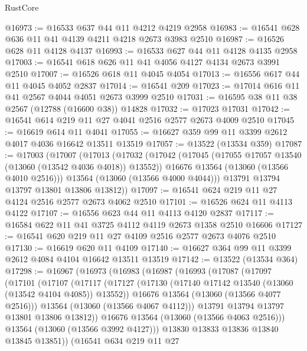 \begin{lexlean}{RustCore}
\begin{coremodule}
@16973 := @16533 @637 @44 @11 @4212 @4219 @2958
@16983 := @16541 @628 @636 @11 @41 @4139 @4211 @4218 @2673 @3983 @2510
@16987 := @16526 @628 @11 @4128 @4137
@16993 := @16533 @627 @44 @11 @4128 @4135 @2958
@17003 := @16541 @618 @626 @11 @41 @4056 @4127 @4134 @2673 @3991 @2510
@17007 := @16526 @618 @11 @4045 @4054
@17013 := @16556 @617 @44 @11 @4045 @4052 @2837
@17014 := @16541 @209
@17023 := @17014 @616 @11 @41 @2567 @4044 @4051 @2673 @3999 @2510
@17031 := @16595 @38 @11 @38 @2567 (@12788 (@16600 @38)) @14828
@17032 := @17023 @17031
@17042 := @16541 @614 @219 @11 @27 @4041 @2516 @2577 @2673 @4009 @2510
@17045 := @16619 @614 @11 @4041
@17055 := @16627 @359 @99 @11 @3399 @2612 @4017 @4036 @16642 @13511 @13519
@17057 := @13522 (@13534 @359)
@17087 := @17003
    (@17007
      (@17013
        (@17032
          (@17042
            (@17045 (@17055 @17057 @13540 (@13060 (@13542 @4036 @4018)) @13552))
            @16676
            @13564
            (@13060 (@13566 @4010 @2516)))
          @13564
          (@13060 (@13566 @4000 @4044)))
        @13791
        @13794
        @13797
        @13801
        @13806
        @13812))
@17097 := @16541 @624 @219 @11 @27 @4124 @2516 @2577 @2673 @4062 @2510
@17101 := @16526 @624 @11 @4113 @4122
@17107 := @16556 @623 @44 @11 @4113 @4120 @2837
@17117 := @16584 @622 @11 @41 @3725 @4112 @4119 @2673 @1358 @2510 @16606
@17127 := @16541 @620 @219 @11 @27 @4109 @2516 @2577 @2673 @4076 @2510
@17130 := @16619 @620 @11 @4109
@17140 := @16627 @364 @99 @11 @3399 @2612 @4084 @4104 @16642 @13511 @13519
@17142 := @13522 (@13534 @364)
@17298 := @16967
    (@16973
      (@16983
        (@16987
          (@16993
            (@17087
              (@17097
                (@17101
                  (@17107
                    (@17117
                      (@17127
                        (@17130 (@17140 @17142 @13540 (@13060 (@13542 @4104 @4085)) @13552))
                        @16676
                        @13564
                        (@13060 (@13566 @4077 @2516)))
                      @13564
                      (@13060 (@13566 @4067 @4112)))
                    @13791
                    @13794
                    @13797
                    @13801
                    @13806
                    @13812))
                @16676
                @13564
                (@13060 (@13566 @4063 @2516)))
              @13564
              (@13060 (@13566 @3992 @4127)))
            @13830
            @13833
            @13836
            @13840
            @13845
            @13851))
        (@16541
          @634
          @219
          @11
          @27

\end{coremodule}
\end{lexlean}
